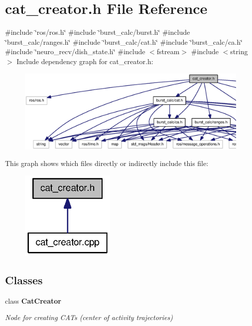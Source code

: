 \section{cat\-\_\-creator.\-h \-File \-Reference}
\label{cat__creator_8h}
{\ttfamily \#include \char`\"{}ros/ros.\-h\char`\"{}}\*
{\ttfamily \#include \char`\"{}burst\-\_\-calc/burst.\-h\char`\"{}}\*
{\ttfamily \#include \char`\"{}burst\-\_\-calc/ranges.\-h\char`\"{}}\*
{\ttfamily \#include \char`\"{}burst\-\_\-calc/cat.\-h\char`\"{}}\*
{\ttfamily \#include \char`\"{}burst\-\_\-calc/ca.\-h\char`\"{}}\*
{\ttfamily \#include \char`\"{}neuro\-\_\-recv/dish\-\_\-state.\-h\char`\"{}}\*
{\ttfamily \#include $<$fstream$>$}\*
{\ttfamily \#include $<$string$>$}\*
\-Include dependency graph for cat\-\_\-creator.\-h\-:\nopagebreak
\begin{figure}[H]
\begin{center}
\leavevmode
\includegraphics[width=350pt]{cat__creator_8h__incl}
\end{center}
\end{figure}
\-This graph shows which files directly or indirectly include this file\-:\nopagebreak
\begin{figure}[H]
\begin{center}
\leavevmode
\includegraphics[width=128pt]{cat__creator_8h__dep__incl}
\end{center}
\end{figure}
\subsection*{\-Classes}
\begin{DoxyCompactItemize}
\item 
class {\bf \-Cat\-Creator}
\begin{DoxyCompactList}\small\item\em \-Node for creating \-C\-A\-Ts (center of activity trajectories) \end{DoxyCompactList}\end{DoxyCompactItemize}
